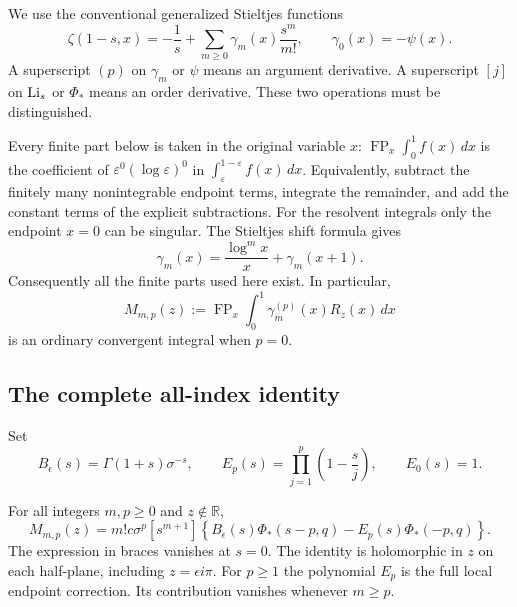 We use the conventional generalized Stieltjes functions
\begin{equation}\label{res:stieltjes}
 \zeta(1-s,x)=-\frac1s+
       \sum_{m\ge0}\gamma_m(x)\frac{s^m}{m!},\qquad
 \gamma_0(x)=-\psi(x).
\end{equation}
A superscript $(p)$ on $\gamma_m$ or $\psi$ means an argument
derivative. A superscript $[j]$ on $\operatorname{Li}_s$ or $\Phi_*$ means an order
derivative. These two operations must be distinguished.

Every finite part below is taken in the original variable $x$:
$\operatorname{FP}_x\int_0^1 f(x)\,dx$ is the coefficient of
$\varepsilon^0(\log\varepsilon)^0$ in
$\int_\varepsilon^{1-\varepsilon}f(x)\,dx$. Equivalently, subtract
the finitely many nonintegrable endpoint terms, integrate the
remainder, and add the constant terms of the explicit subtractions.
For the resolvent integrals only the endpoint $x=0$ can be singular.
The Stieltjes shift formula gives
\begin{equation}\label{res:singularpart}
 \gamma_m(x)=\frac{\log^m x}{x}+\gamma_m(x+1).
\end{equation}
Consequently all the finite parts used here exist. In particular,
\[
 M_{m,p}(z):=\operatorname{FP}_x\int_0^1\gamma_m^{(p)}(x)R_z(x)\,dx
\]
is an ordinary convergent integral when $p=0$.

\subsection{The complete all-index identity}

Set
\begin{equation}\label{res:BE}
 B_\epsilon(s)=\Gamma(1+s)\sigma^{-s},\qquad
 E_p(s)=\prod_{j=1}^p\left(1-\frac{s}{j}\right),\qquad E_0(s)=1.
\end{equation}

\begin{theorem}
\label{res:main}
For all integers $m,p\ge0$ and $z\notin\mathbb R$,
\begin{equation}\label{res:master}
 \boxed{\displaystyle
 M_{m,p}(z)=m!c\sigma^p[s^{m+1}]
 \left\{B_\epsilon(s)\Phi_*(s-p,q)
                   -E_p(s)\Phi_*(-p,q)\right\}.}
\end{equation}
The expression in braces vanishes at $s=0$. The identity is
holomorphic in $z$ on each half-plane, including $z=\epsilon i\pi$.
For $p\ge1$ the polynomial $E_p$ is the full local endpoint
correction. Its contribution vanishes whenever $m\ge p$.
\end{theorem}

